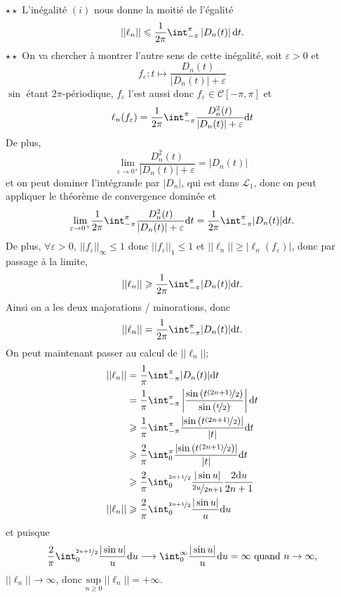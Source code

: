 \documentclass[a4paper,11pt, twoside]{article}
\begin{document}
\begin{Proof}
  $\star\star$ L'inégalité $(i)$ nous donne la moitié de l'égalité
  $$||\ell_n||\leqslant\frac{1}{2\pi}\int_{-\pi}^{\pi}\left|D_n(t)\right|\dt.$$
  $\star\star$ On va chercher à montrer l'autre sens de cette inégalité, soit $\varepsilon>0$ et 
  $$f_\varepsilon:t\longmapsto \frac{D_n(t)}{|D_n(t)|+\varepsilon}$$
  $\sin$ étant $2\pi$-périodique, $f_\varepsilon$ l'est aussi donc $f_\varepsilon\in\mathcal C[-\pi,\pi]$ et 
  $$\ell_n(f_\varepsilon)=\frac{1}{2\pi}\int_{-\pi}^{\pi}\frac{D_n^2(t)}{|D_n(t)|+\varepsilon}\dt$$
  De plus, 
  $$\underset{\varepsilon\to 0^+}{\mathrm{lim}}\frac{D_n^2(t)}{|D_n(t)|+\varepsilon}=|D_n(t)|$$
  et on peut dominer l'intégrande par $|D_n|$, qui est dans $\mathcal L_1$, donc on peut appliquer le théorème de convergence dominée et 
  $$\underset{\varepsilon\to 0^+}{\mathrm{lim}}\frac{1}{2\pi}\int_{-\pi}^{\pi}\frac{D_n^2(t)}{|D_n(t)|+\varepsilon}\dt=\frac{1}{2\pi}\int_{-\pi}^{\pi}|D_n(t)|\dt.$$
  De plus, $\forall \varepsilon>0,\ ||f_\varepsilon||_\infty\leqslant 1$ donc $||f_\varepsilon||_1\leqslant 1$ et $||\ell_n||\geqslant |\ell_n(f_\varepsilon)|$, donc par passage à la limite, 
  $$||\ell_n||\geqslant \frac{1}{2\pi}\int_{-\pi}^{\pi}|D_n(t)|\dt.$$
  Ainsi on a les deux majorations / minorations, donc 
  $$||\ell_n||= \frac{1}{2\pi}\int_{-\pi}^{\pi}|D_n(t)|\dt.$$
  On peut maintenant passer au calcul de $||\ell_n||$;
  \begin{align*}
    ||\ell_n||&=\frac{1}{\pi}\int_{-\pi}^{\pi}|D_n(t)|\dt\\
    &=\frac{1}{\pi}\int_{-\pi}^{\pi}\left|\frac{\sin\left(t\nicefrac{(2n+1)}{2}\right)}{\sin\left(\nicefrac{t}{2}\right)}\right|\dt\\
    &\geqslant\frac{1}{\pi}\int_{-\pi}^{\pi}\frac{\left|\sin\left(t\nicefrac{(2n+1)}{2}\right)\right|}{|t|}\dt\\
    &\geqslant\frac{2}{\pi}\int_0^{\pi}\frac{\left|\sin\left(t\nicefrac{(2n+1)}{2}\right)\right|}{|t|}\dt\\
    &\geqslant \frac{2}{\pi}\int_0^{\nicefrac{2n+1}{2}}\frac{|\sin u|}{\nicefrac{2u}{2n+1}}\frac{2\mathrm du}{2n+1}\\
    ||\ell_n||&\geqslant \frac{2}{\pi}\int_0^{\nicefrac{2n+1}{2}}\frac{|\sin u|}{u}\mathrm du\\
  \end{align*}
  et puisque 
  $$\frac{2}{\pi}\int_0^{\nicefrac{2n+1}{2}}\frac{|\sin u|}{u}\mathrm du\longrightarrow\dstyle\int_{0}^{\infty}\frac{|\sin u|}{u}\mathrm du = \infty\text{ quand }n\to\infty,$$
  $||\ell_n||\longrightarrow\infty$, donc $\underset{n\geqslant 0}{\mathrm{sup}}\ ||\ell_n||=+\infty$.
\end{Proof}
\end{document}
